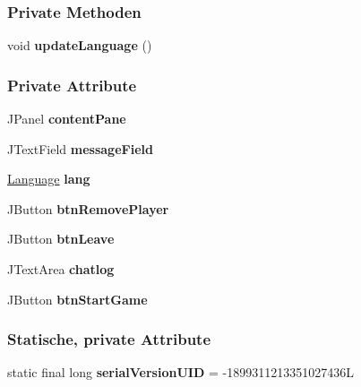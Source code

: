 \subsubsection*{Private Methoden}
\begin{DoxyCompactItemize}
\item 
\hypertarget{a00012_a74cba330cee84fa07487e12fdafe29aa}{void {\bfseries update\-Language} ()}\label{a00012_a74cba330cee84fa07487e12fdafe29aa}

\end{DoxyCompactItemize}
\subsubsection*{Private Attribute}
\begin{DoxyCompactItemize}
\item 
\hypertarget{a00012_aee369a2eca6b8f16ea106cddf68273e8}{J\-Panel {\bfseries content\-Pane}}\label{a00012_aee369a2eca6b8f16ea106cddf68273e8}

\item 
\hypertarget{a00012_aeaa6444a9657e78f8c42051d5f7b4ff6}{J\-Text\-Field {\bfseries message\-Field}}\label{a00012_aeaa6444a9657e78f8c42051d5f7b4ff6}

\item 
\hypertarget{a00012_a430764470b3602491655161cdd67ee8c}{\hyperlink{a00015}{Language} {\bfseries lang}}\label{a00012_a430764470b3602491655161cdd67ee8c}

\item 
\hypertarget{a00012_ad9e9e9e7b8ce2d427def6cc55ef526bd}{J\-Button {\bfseries btn\-Remove\-Player}}\label{a00012_ad9e9e9e7b8ce2d427def6cc55ef526bd}

\item 
\hypertarget{a00012_a1887f14b78aa91b00e5ce42aa504dbe2}{J\-Button {\bfseries btn\-Leave}}\label{a00012_a1887f14b78aa91b00e5ce42aa504dbe2}

\item 
\hypertarget{a00012_a12e216d7d1a56c6e799be1f874c7c82c}{J\-Text\-Area {\bfseries chatlog}}\label{a00012_a12e216d7d1a56c6e799be1f874c7c82c}

\item 
\hypertarget{a00012_a1ac11a30aed65ffc1a336a48515ea9de}{J\-Button {\bfseries btn\-Start\-Game}}\label{a00012_a1ac11a30aed65ffc1a336a48515ea9de}

\end{DoxyCompactItemize}
\subsubsection*{Statische, private Attribute}
\begin{DoxyCompactItemize}
\item 
\hypertarget{a00012_a3238d314ecdee14d2966760945d00c3b}{static final long {\bfseries serial\-Version\-U\-I\-D} = -\/1899311213351027436\-L}\label{a00012_a3238d314ecdee14d2966760945d00c3b}

\end{DoxyCompactItemize}


